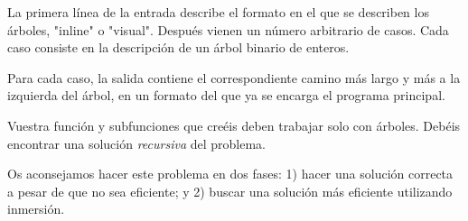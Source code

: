 \Input

La primera línea de la entrada describe el formato en el que se describen los árboles, "inline" o "visual". Después vienen un número arbitrario de casos. Cada caso consiste en la descripción de un árbol binario de enteros.

\Output

Para cada caso, la salida contiene el correspondiente camino más largo y más a la izquierda del árbol, en un formato del que ya se encarga el programa principal.

\Observation

Vuestra función y subfunciones que creéis deben trabajar solo con árboles. Debéis encontrar una solución \emph{recursiva} del problema.

\medskip

Os aconsejamos hacer este problema en dos fases: 1) hacer una solución correcta a pesar de que no sea eficiente; y 2) buscar una solución más eficiente utilizando inmersión.

\SampleTwoCol
